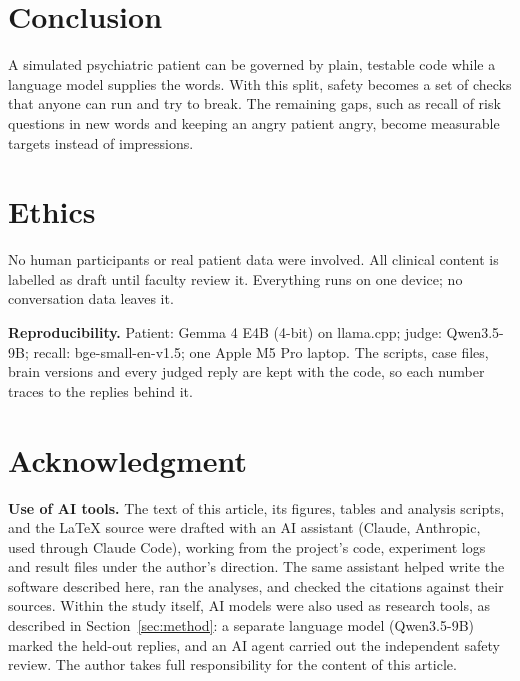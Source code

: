 \documentclass[conference]{IEEEtran}
\begin{document}
\section{Conclusion}
A simulated psychiatric patient can be governed by plain, testable code while a language model supplies the words. With this split, safety becomes a set of checks that anyone can run and try to break. The remaining gaps, such as recall of risk questions in new words and keeping an angry patient angry, become measurable targets instead of impressions.

\section*{Ethics}
No human participants or real patient data were involved. All clinical content is labelled as draft until faculty review it. Everything runs on
one device; no conversation data leaves it.

\textbf{Reproducibility.} Patient: Gemma 4 E4B (4-bit) on llama.cpp; judge: Qwen3.5-9B; recall: bge-small-en-v1.5; one Apple M5 Pro laptop.
The scripts, case files, brain versions and every judged reply are kept with the code, so each number traces to the replies behind it.

\section*{Acknowledgment}
\textbf{Use of AI tools.} The text of this article, its figures, tables and analysis scripts, and the \LaTeX{} source were
drafted with an AI assistant (Claude, Anthropic, used through Claude Code), working from the project's code, experiment logs and result
files under the author's direction. The same assistant helped write the software described here, ran the analyses, and checked the
citations against their sources. Within the study itself, AI models were also used as research tools, as described in Section~\ref{sec:method}: a separate language model (Qwen3.5-9B) marked the held-out replies, and an AI agent carried out the independent safety review. The author takes full responsibility for the content of this article.



\end{document}
